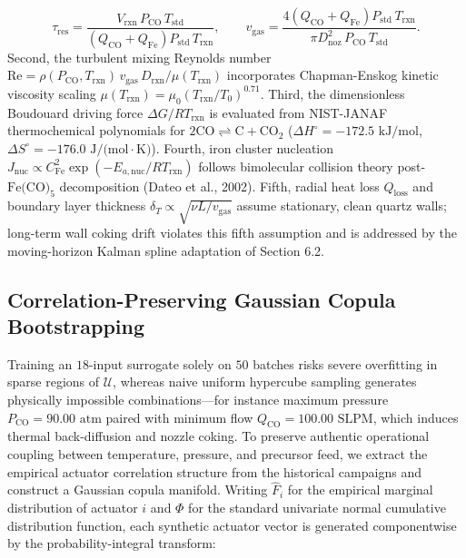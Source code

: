 \documentclass[10pt,journal,onecolumn]{IEEEtran}
\begin{document}
\begin{equation}
\tau_{\text{res}} = \frac{V_{\text{rxn}}\, P_{\text{CO}}\, T_{\text{std}}}{\left(Q_{\text{CO}} + Q_{\text{Fe}}\right) P_{\text{std}}\, T_{\text{rxn}}}, \qquad v_{\text{gas}} = \frac{4\left(Q_{\text{CO}} + Q_{\text{Fe}}\right) P_{\text{std}}\, T_{\text{rxn}}}{\pi D_{\text{noz}}^2\, P_{\text{CO}}\, T_{\text{std}}}.
\end{equation}
Second, the turbulent mixing Reynolds number $\text{Re} = \rho(P_{\text{CO}}, T_{\text{rxn}})\, v_{\text{gas}}\, D_{\text{rxn}} / \mu(T_{\text{rxn}})$ incorporates Chapman-Enskog kinetic viscosity scaling $\mu(T_{\text{rxn}}) = \mu_0 (T_{\text{rxn}}/T_0)^{0.71}$. Third, the dimensionless Boudouard driving force $\Delta G / RT_{\text{rxn}}$ is evaluated from NIST-JANAF thermochemical polynomials for $2\text{CO} \rightleftharpoons \text{C} + \text{CO}_2$ ($\Delta H^\circ = -172.5\text{ kJ/mol}$, $\Delta S^\circ = -176.0\text{ J/(mol}\cdot\text{K)}$). Fourth, iron cluster nucleation $J_{\text{nuc}} \propto C_{\text{Fe}}^2 \exp(-E_{a,\text{nuc}} / RT_{\text{rxn}})$ follows bimolecular collision theory post-$\text{Fe(CO)}_5$ decomposition (Dateo et al., 2002). Fifth, radial heat loss $Q_{\text{loss}}$ and boundary layer thickness $\delta_T \propto \sqrt{\nu L / v_{\text{gas}}}$ assume stationary, clean quartz walls; long-term wall coking drift violates this fifth assumption and is addressed by the moving-horizon Kalman spline adaptation of Section 6.2.

\subsection{Correlation-Preserving Gaussian Copula Bootstrapping}
Training an $18$-input surrogate solely on $50$ batches risks severe overfitting in sparse regions of $\mathcal{U}$, whereas naive uniform hypercube sampling generates physically impossible combinations—for instance maximum pressure $P_{\text{CO}} = 90.00\text{ atm}$ paired with minimum flow $Q_{\text{CO}} = 100.00\text{ SLPM}$, which induces thermal back-diffusion and nozzle coking. To preserve authentic operational coupling between temperature, pressure, and precursor feed, we extract the empirical actuator correlation structure from the historical campaigns and construct a Gaussian copula manifold. Writing $\hat{F}_i$ for the empirical marginal distribution of actuator $i$ and $\Phi$ for the standard univariate normal cumulative distribution function, each synthetic actuator vector is generated componentwise by the probability-integral transform:
\end{document}
